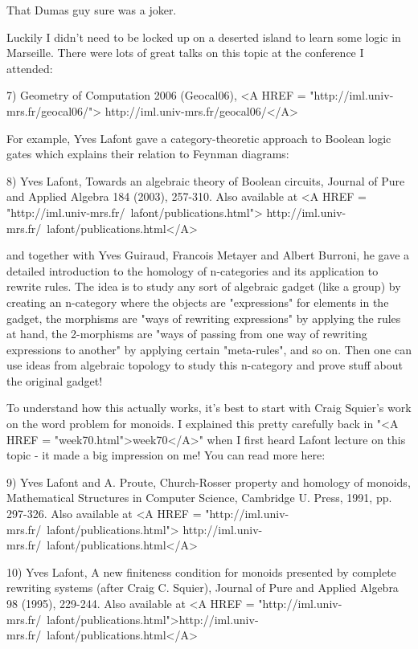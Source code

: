 That Dumas guy sure was a joker.

Luckily I didn't need to be locked up on a deserted island to learn
some logic in Marseille.  There were lots of great talks on this topic
at the conference I attended:

7) Geometry of Computation 2006 (Geocal06), 
<A HREF = "http://iml.univ-mrs.fr/geocal06/">
http://iml.univ-mrs.fr/geocal06/</A>

For example, Yves Lafont gave a category-theoretic approach to Boolean
logic gates which explains their relation to Feynman diagrams:

8) Yves Lafont, Towards an algebraic theory of Boolean circuits, 
Journal of Pure and Applied Algebra 184 (2003), 257-310.  Also
available at 
<A HREF = "http://iml.univ-mrs.fr/~lafont/publications.html">
http://iml.univ-mrs.fr/~lafont/publications.html</A>

and together with Yves Guiraud, Francois Metayer and Albert Burroni,  
he gave a detailed introduction to the homology of n-categories and
its application to rewrite rules.  The idea is to study any sort of
algebraic gadget (like a group) by creating an n-category where the 
objects are "expressions" for elements in the gadget, the morphisms 
are "ways of rewriting expressions" by applying the rules at hand, 
the 2-morphisms are "ways of passing from one way of rewriting 
expressions to another" by applying certain "meta-rules", 
and so on.  
Then one can use ideas from algebraic topology to study this 
n-category and prove stuff about the original gadget!

To understand how this actually works, it's best to start with Craig 
Squier's work on the word problem for monoids.  I explained this 
pretty carefully back in "<A HREF = "week70.html">week70</A>" 
when I first heard Lafont lecture 
on this topic - it made a big impression on me!  You can read more here: 

9) Yves Lafont and A. Proute, Church-Rosser property and homology of 
monoids, Mathematical Structures in Computer Science, Cambridge U.
Press, 1991, pp. 297-326.  Also available at 
<A HREF = "http://iml.univ-mrs.fr/~lafont/publications.html">
http://iml.univ-mrs.fr/~lafont/publications.html</A>

10) Yves Lafont, A new finiteness condition for monoids presented by 
complete rewriting systems (after Craig C. Squier), Journal of Pure and 
Applied Algebra 98 (1995), 229-244.  Also available at
<A HREF = "http://iml.univ-mrs.fr/~lafont/publications.html">http://iml.univ-mrs.fr/~lafont/publications.html</A>

